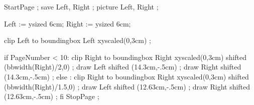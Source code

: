 
    {}
    {}

\setupcolors[textcolor={simpleslides:textcolor}]



\beginOLDTEX
{}

\endOLDTEX

\beginLUATEX
{}
\endLUATEX





\unexpanded{}

\unexpanded{}


StartPage ;
save Left, Right ;
picture Left, Right ;

Left  :=  ysized 6cm; 
Right :=  ysized 6cm; 

clip Left  to boundingbox Left  xyscaled(0,3cm) ;

if PageNumber < 10:
	clip Right to boundingbox Right xyscaled(0,3cm) shifted (bbwidth(Right)/2,0) ;
	draw Left  shifted (14.3cm,-.5cm) ;
	draw Right shifted (14.3cm,-.5cm) ;
else :
	clip Right to boundingbox Right xyscaled(0,3cm) shifted (bbwidth(Right)/1.5,0) ;
	draw Left  shifted (12.63cm,-.5cm) ; 
	draw Right shifted (12.63cm,-.5cm) ;
fi
StopPage ;
\stopuseMPgraphic

